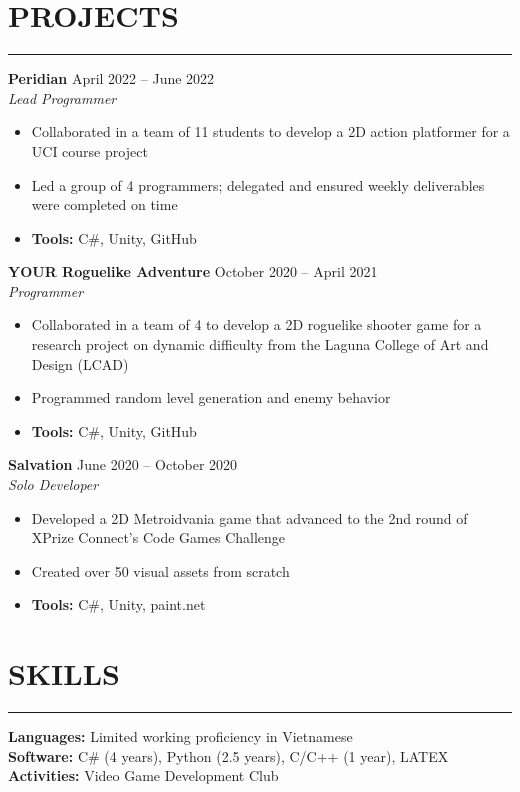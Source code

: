 \documentclass{article}
\begin{document}
\section*{PROJECTS} \vspace{-6pt} \hrule \vspace{6pt}
\textbf{Peridian} \hfill April 2022 -- June 2022\\
\emph{Lead Programmer}
\begin{itemize}
	\item\vspace{-6pt} Collaborated in a team of 11 students to develop a 2D action platformer for a UCI course project
	\item\vspace{-6pt} Led a group of 4 programmers; delegated and ensured weekly deliverables were completed on time
	\item\vspace{-6pt} \textbf{Tools:} C\#, Unity, GitHub
\end{itemize}
\vspace{-6pt}
\textbf{YOUR Roguelike Adventure} \hfill October 2020 -- April 2021\\
\emph{Programmer}
\begin{itemize}
	\item\vspace{-6pt} Collaborated in a team of 4 to develop a 2D roguelike shooter game for a research project on dynamic difficulty from the Laguna College of Art and Design (LCAD)
	\item\vspace{-6pt} Programmed random level generation and enemy behavior
	\item\vspace{-6pt} \textbf{Tools:} C\#, Unity, GitHub
\end{itemize}
\vspace{-6pt}
\textbf{Salvation} \hfill June 2020 -- October 2020\\
\emph{Solo Developer}
\begin{itemize}
	\item\vspace{-6pt} Developed a 2D Metroidvania game that advanced to the 2nd round of XPrize Connect's Code Games Challenge
	\item\vspace{-6pt} Created over 50 visual assets from scratch
	\item\vspace{-6pt} \textbf{Tools:} C\#, Unity, paint.net
\end{itemize}
\vspace{-10pt}

\section*{SKILLS} \vspace{-6pt} \hrule \vspace{6pt}
\textbf{Languages:} Limited working proficiency in Vietnamese\\
\textbf{Software:} C$\#$ (4 years), Python (2.5 years), C/C++ (1 year), LATEX  \\
\textbf{Activities:} Video Game Development Club
\end{document}
